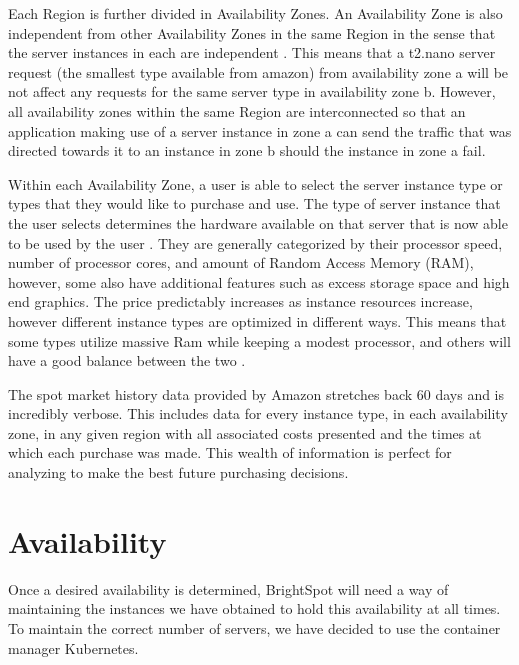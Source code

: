 \documentclass[thesis,proposal]{umassthesis}  %
\begin{document}
Each Region is further divided in Availability Zones. An Availability Zone is also independent from other Availability Zones in the same Region in the sense that the server instances in each are independent \cite{ec2RegionsAndAZ}. This means that a t2.nano server request (the smallest type available from amazon) from availability zone a will be not affect any requests for the same server type in availability zone b. However, all availability zones within the same Region are interconnected so that an application making use of a server instance in zone a can send the traffic that was directed towards it to an instance in zone b should the instance in zone a fail.\par

Within each Availability Zone, a user is able to select the server instance type or types that they would like to purchase and use. The type of server instance that the user selects determines the hardware available on that server that is now able to be used by the user \cite{amazonEC2Pricing}. They are generally categorized by their processor speed, number of processor cores, and amount of Random Access Memory (RAM), however, some also have additional features such as excess storage space and high end graphics. The price predictably increases as instance resources increase, however different instance types are optimized in different ways. This means that some types utilize massive Ram while keeping a modest processor, and others will have a good balance between the two \cite{amazonEC2Pricing}.\par

The spot market history data provided by Amazon stretches back 60 days and is incredibly verbose. This includes data for every instance type, in each availability zone, in any given region with all associated costs presented and the times at which each purchase was made. This wealth of information is perfect for analyzing to make the best future purchasing decisions.\par




\section{Availability}

Once a desired availability is determined, BrightSpot will need a way of maintaining the instances we have obtained to hold this availability at all times. To maintain the correct number of servers, we have decided to use the container manager Kubernetes.
\end{document}
